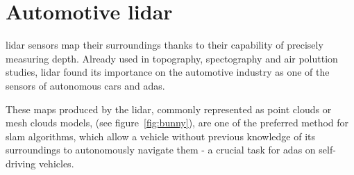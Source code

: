 
\section{Automotive \ac{lidar}}
\ac{lidar} sensors map their surroundings thanks to their capability of precisely measuring depth. Already used in topography, spectography and air poluttion studies, \ac{lidar} found its importance on the automotive industry as one of the sensors of autonomous cars and \ac{adas}\cite{Sullivan2016}. 

These maps produced by the \ac{lidar}, commonly represented as point clouds or mesh clouds models, (see figure~\ref{fig:bunny}), are one of the preferred method for \ac{slam} algorithms, which allow a vehicle without previous knowledge of its surroundings to autonomously navigate them - a crucial task for \ac{adas} on self-driving vehicles.

